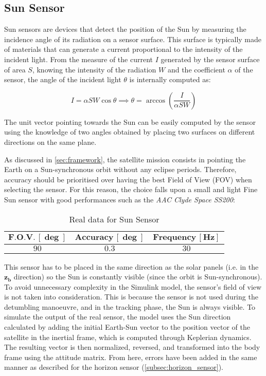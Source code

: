 \subsection{Sun Sensor}
\label{subsec:sun_sensor}

Sun sensors are devices that detect the position of the Sun by measuring the incidence angle of its radiation on a sensor surface. This surface is typically made of materials that can generate a current proportional to the intensity of the incident light. From the measure of the current $I$ generated by the sensor surface of area $S$, knowing the intensity of the radiation $W$ and the coefficient $\alpha$ of the sensor, the angle of the incident light $\theta$ is internally computed as:

\begin{equation}
    I = \alpha S W \cos \theta  \implies  \theta = \arccos \left( \frac{I}{\alpha S W} \right)
\end{equation}

The unit vector pointing towards the Sun can be easily computed by the sensor using the knowledge of two angles obtained by placing two surfaces on different directions on the same plane.

As discussed in \autoref{sec:framework}, the satellite mission consists in pointing the Earth on a Sun-synchronous orbit without any eclipse periods. Therefore, accuracy should be prioritised over having the best Field of View (FOV) when selecting the sensor. For this reason, the choice falls upon a small and light Fine Sun sensor with good performances such as the \textit{AAC Clyde Space SS200}:

\begin{table}[H]

    \centering
    \begin{tabular}{|c|c|c|}
    \hline
    $\bm{F.O.V. \, [\deg]}$ & $\bm{Accuracy \, [\deg]}$ & $\bm{Frequency \, [Hz]}$ \\
    \hline
    $90$ & $0.3$ & $30$  \\
    \hline
    \end{tabular}
    
    \caption{Real data for Sun Sensor}
    \label{table:Sun_sensor}
    
\end{table}

This sensor has to be placed in the same direction as the solar panels (i.e. in the $\boldsymbol{z_b}$ direction) so the Sun is constantly visible (since the orbit is Sun-synchronous). To avoid unnecessary complexity in the Simulink model, the sensor's field of view is not taken into consideration. This is because the sensor is not used during the detumbling manoeuvre, and in the tracking phase, the Sun is always visible.
To simulate the output of the real sensor, the model uses the Sun direction calculated by adding the initial Earth-Sun vector to the position vector of the satellite in the inertial frame, which is computed through Keplerian dynamics. The resulting vector is then normalized, reversed, and transformed into the body frame using the attitude matrix. From here, errors have been added in the same manner as described for the horizon sensor (\autoref{subsec:horizon_sensor}).